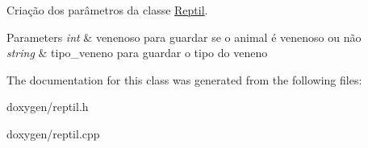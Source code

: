 Criação dos parâmetros da classe \mbox{\hyperlink{class_reptil}{Reptil}}. 


\begin{DoxyParams}{Parameters}
{\em int} & venenoso para guardar se o animal é venenoso ou não \\
\hline
{\em string} & tipo\+\_\+veneno para guardar o tipo do veneno \\
\hline
\end{DoxyParams}


The documentation for this class was generated from the following files\+:\begin{DoxyCompactItemize}
\item 
doxygen/reptil.\+h\item 
doxygen/reptil.\+cpp\end{DoxyCompactItemize}
